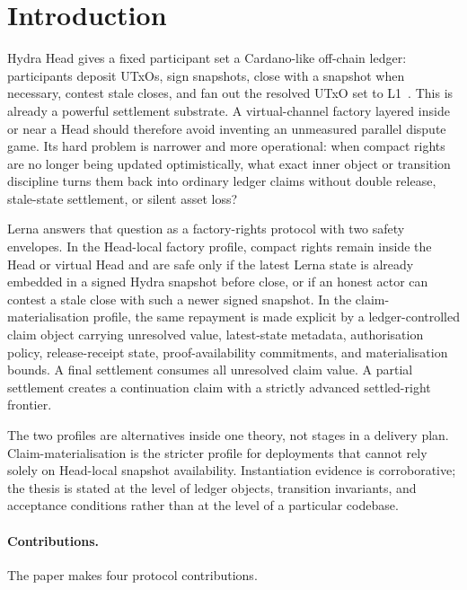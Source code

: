 \documentclass[a4paper,11pt]{article}
\theoremstyle{definition}
\theoremstyle{plain}
\theoremstyle{remark}
\begin{document}
\tableofcontents
\clearpage
{}

\section{Introduction}
\label{sec:intro}

Hydra Head gives a fixed participant set a Cardano-like off-chain ledger:
participants deposit UTxOs, sign snapshots, close with a snapshot when
necessary, contest stale closes, and fan out the resolved UTxO set to
L1~\cite{hydra-paper,hydra-docs}. This is already a powerful settlement
substrate. A virtual-channel factory layered inside or near a Head should
therefore avoid inventing an unmeasured parallel dispute game. Its hard problem
is narrower and more operational: when compact rights are no longer being
updated optimistically, what exact inner object or transition discipline turns
them back into ordinary ledger claims without double release, stale-state
settlement, or silent asset loss?

Lerna answers that question as a factory-rights protocol with two safety
envelopes. In the Head-local factory profile, compact rights remain inside the
Head or virtual Head and are safe only if the latest Lerna state is already
embedded in a signed Hydra snapshot before close, or if an honest actor can
contest a stale close with such a newer signed snapshot. In the
claim-materialisation profile, the same repayment is made explicit by a
ledger-controlled claim object carrying unresolved value, latest-state metadata,
authorisation policy, release-receipt state, proof-availability commitments, and
materialisation bounds. A final settlement consumes all unresolved claim value.
A partial settlement creates a continuation claim with a strictly advanced
settled-right frontier.

The two profiles are alternatives inside one theory, not stages in a delivery
plan. Claim-materialisation is the stricter profile for deployments that cannot
rely solely on Head-local snapshot availability. Instantiation evidence is
corroborative; the thesis is stated at the level of ledger objects, transition
invariants, and acceptance conditions rather than at the level of a particular
codebase.

\paragraph{Contributions.}
The paper makes four protocol contributions.
\end{document}

